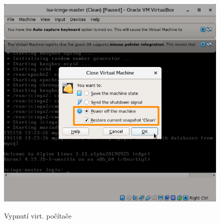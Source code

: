 \begin{figure}
	\caption{Vypnutí virt. počítače}
	\centering
	\includegraphics[width=0.67\linewidth]{files/vbox-shutdown.png}
	\label{fig:shutdown}
\end{figure}
